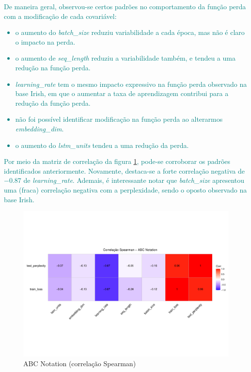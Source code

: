\documentclass{automatextcc}
\newcommand{\nico}[1]{\textcolor{teal}{#1}}
\begin{document}
\nico{
De maneira geral, observou-se certos padrões no comportamento da função perda com a modificação de cada covariável:
\begin{itemize}
    \item o aumento do \textit{batch\_size} reduziu variabilidade a cada época, mas não é claro o impacto na perda.
    \item o aumento de \textit{seq\_length} reduziu a variabilidade também, e tendeu a uma redução na função perda.
    \item \textit{learning\_rate} tem o mesmo impacto expressivo na função perda observado na base Irish, em que o aumentar a taxa de aprendizagem contribui para a redução da função perda. 
    \item não foi possível identificar modificação na função perda ao alterarmos \textit{embedding\_dim}.
    \item o aumento do \textit{lstm\_units} tendeu a uma redução da perda. 
\end{itemize}
Por meio da matriz de correlação da figura \ref{fig:abcnotation_tanh_corr}, pode-se corroborar os padrões identificados anteriormente. Novamente, destaca-se a forte correlação negativa de $-0.87$ de \textit{learning\_rate}. Ademais, é interessante notar que \textit{batch\_size} apresentou uma (fraca) correlação negativa com a perplexidade, sendo o oposto observado na base Irish.  
}
\begin{figure}
    \label{fig:abcnotation_tanh_corr}
    \centering
    \includegraphics[width=\textwidth]{abcnotation_tanh_corr.pdf}
    \caption{ABC Notation (correlação Spearman)}
\end{figure}
\end{document}
